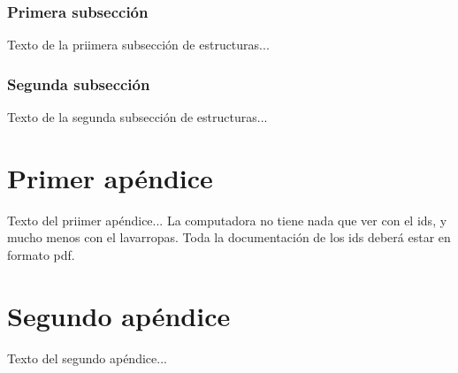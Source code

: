 \documentclass{book}
\begin{document}
\subsection{Primera subsección}
Texto de la priimera subsección de estructuras...

\subsection{Segunda subsección}
Texto de la segunda subsección de estructuras...

\appendix
\chapter{Primer apéndice}
Texto del priimer apéndice...
La \gls{computadora} no tiene nada que ver con el \gls{ids}, y mucho menos con el \gls{lavarropas}.
Toda la documentación de los \gls{ids} deberá estar en formato \gls{pdf}.

\chapter{Segundo apéndice}
Texto del segundo apéndice...

\backmatter

\newpage
\printglossary[type=main]
\newpage
\printglossary[type=\acronymtype]
\end{document}
